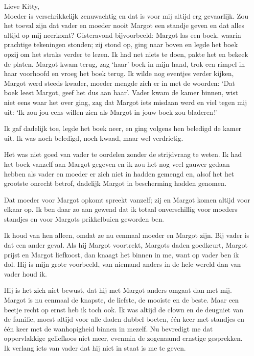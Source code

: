 \documentclass{book}
\begin{document}
Lieve Kitty,\\
Moeder is verschrikkelijk zenuwachtig en dat is voor mij altijd
erg gevaarlijk. Zou het toeval zijn dat vader en moeder nooit Margot een standje
geven en dat alles altijd op mij neerkomt? Gisteravond bijvoorbeeld: Margot las
een boek, waarin prachtige tekeningen stonden; zij stond op, ging naar boven en
legde het boek opzij om het straks verder te lezen. Ik had net niets te doen,
pakte het en bekeek de platen. Margot kwam terug, zag `haar' boek in mijn hand,
trok een rimpel in haar voorhoofd en vroeg het boek terug. Ik wilde nog eventjes
verder kijken, Margot werd steeds kwader, moeder mengde zich er in met de
woorden: `Dat boek leest Margot, geef het dus aan haar'. Vader kwam de kamer
binnen, wist niet eens waar het over ging, zag dat Margot iets misdaan werd en
viel tegen mij uit: `Ik zou jou eens willen zien als Margot in jouw boek zou
bladeren!'

Ik gaf dadelijk toe, legde het boek neer, en ging volgens hen beledigd de kamer
uit. Ik was noch beledigd, noch kwaad, maar wel verdrietig.

Het was niet goed van vader te oordelen zonder de strijdvraag te weten.  Ik had
het boek vanzelf aan Margot gegeven en ik zou het nog veel gauwer gedaan hebben
als vader en moeder er zich niet in hadden gemengd en, alsof het het grootste
onrecht betrof, dadelijk Margot in bescherming hadden genomen.

Dat moeder voor Margot opkomt spreekt vanzelf; zij en Margot komen altijd voor
elkaar op. Ik ben daar zo aan gewend dat ik totaal onverschillig voor moeders
standjes en voor Margots prikkelbuien geworden ben.

Ik houd van hen alleen, omdat ze nu eenmaal moeder en Margot zijn. Bij vader is
dat een ander geval. Als hij Margot voortrekt, Margots daden goedkeurt, Margot
prijst en Margot liefkoost, dan knaagt het binnen in me, want op vader ben ik
dol. Hij is mijn grote voorbeeld, van niemand anders in de hele wereld dan van
vader houd ik.

Hij is het zich niet bewust, dat hij met Margot anders omgaat dan met mij.
Margot is nu eenmaal de knapste, de liefste, de mooiste en de beste. Maar een
beetje recht op ernst heb ik toch ook. Ik was altijd de clown en de deugniet van
de familie, moest altijd voor alle daden dubbel boeten, één keer met standjes en
één keer met de wanhopigheid binnen in mezelf. Nu bevredigt me dat oppervlakkige
geliefkoos niet meer, evenmin de zogenaamd ernstige gesprekken. Ik verlang iets
van vader dat hij niet in staat is me te geven.
\end{document}
